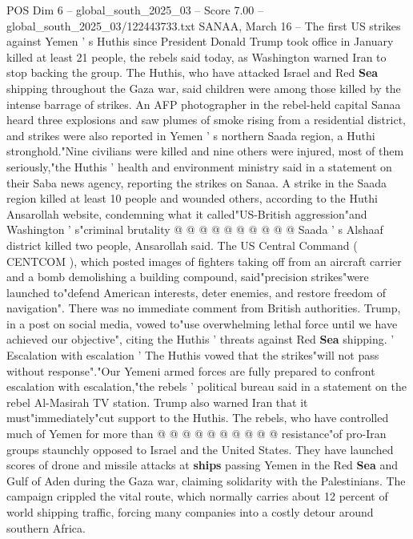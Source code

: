 \begin{textsample}{POS Dim 6 – global\_south\_2025\_03 – Score 7.00 – global\_south\_2025\_03/122443733.txt}  \label{ex:f6_pos_311}
SANAA, March 16 -- The first US strikes against Yemen ' s Huthis since President Donald Trump took office in January killed at least 21 people, the rebels said today, as Washington warned Iran to stop backing the group.
The Huthis, who have attacked Israel and Red \textbf{Sea} shipping throughout the Gaza war, said children were among those killed by the intense barrage of strikes.
An AFP photographer in the rebel-held capital Sanaa heard three explosions and saw plumes of smoke rising from a residential district, and strikes were also reported in Yemen ' s northern Saada region, a Huthi stronghold."Nine civilians were killed and nine others were injured, most of them seriously,"the Huthis ' health and environment ministry said in a statement on their Saba news agency, reporting the strikes on Sanaa.
A strike in the Saada region killed at least 10 people and wounded others, according to the Huthi Ansarollah website, condemning what it called"US-British aggression"and Washington ' s"criminal brutality @ @ @ @ @ @ @ @ @ @ Saada ' s Alshaaf district killed two people, Ansarollah said.
The US Central Command ( CENTCOM ), which posted images of fighters taking off from an aircraft carrier and a bomb demolishing a building compound, said"precision strikes"were launched to"defend American interests, deter enemies, and restore freedom of navigation".
There was no immediate comment from British authorities.
Trump, in a post on social media, vowed to"use overwhelming lethal force until we have achieved our objective", citing the Huthis ' threats against Red \textbf{Sea} shipping. ' Escalation with escalation ' The Huthis vowed that the strikes"will not pass without response"."Our Yemeni armed forces are fully prepared to confront escalation with escalation,"the rebels ' political bureau said in a statement on the rebel Al-Masirah TV station.
Trump also warned Iran that it must"immediately"cut support to the Huthis.
The rebels, who have controlled much of Yemen for more than @ @ @ @ @ @ @ @ @ @ resistance"of pro-Iran groups staunchly opposed to Israel and the United States.
They have launched scores of drone and missile attacks at \textbf{ships} passing Yemen in the Red \textbf{Sea} and Gulf of Aden during the Gaza war, claiming solidarity with the Palestinians.
The campaign crippled the vital route, which normally carries about 12 percent of world shipping traffic, forcing many companies into a costly detour around southern Africa.

\end{textsample}
